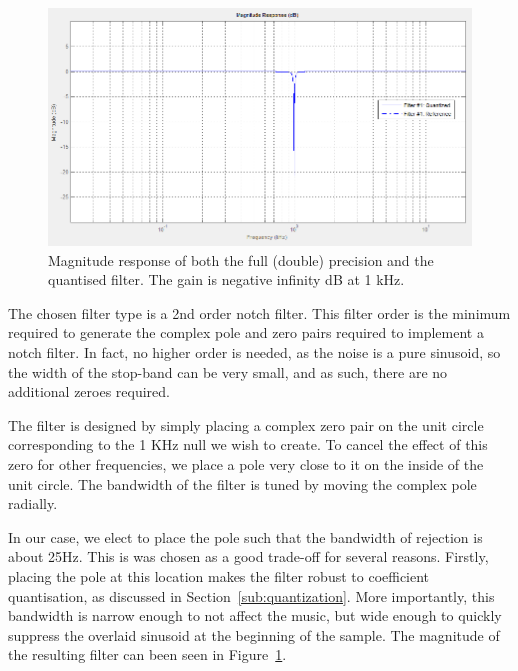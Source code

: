 \documentclass[]{article}
\begin{document}
\begin{figure}[htbp]
	\begin{center}
		\includegraphics[width = \textwidth]{matlabmagnitudelog.PNG}
	\end{center}
	\caption{Magnitude response of both the full (double) precision and the quantised filter. The gain is negative infinity dB at 1 kHz.}
	\label{fig:matlabmagnitudelog}
\end{figure}

The chosen filter type is a 2nd order notch filter. This filter order is the minimum required to generate the complex pole and zero pairs required to implement a notch filter. In fact, no higher order is needed, as the noise is a pure sinusoid, so the width of the stop-band can be very small, and as such, there are no additional zeroes required.

The filter is designed by simply placing a complex zero pair on the unit circle corresponding to the 1 KHz null we wish to create. To cancel the effect of this zero for other frequencies, we place a pole very close to it on the inside of the unit circle. The bandwidth of the filter is tuned by moving the complex pole radially.

In our case, we elect to place the pole such that the bandwidth of rejection is about 25Hz. This is was chosen as a good trade-off for several reasons. Firstly, placing the pole at this location makes the filter robust to coefficient quantisation, as discussed in Section~\ref{sub:quantization}.
More importantly, this bandwidth is narrow enough to not affect the music, but wide enough to quickly suppress the overlaid sinusoid at the beginning of the sample.
The magnitude of the resulting filter can been seen in Figure~\ref{fig:matlabmagnitudelog}.

\end{document}
